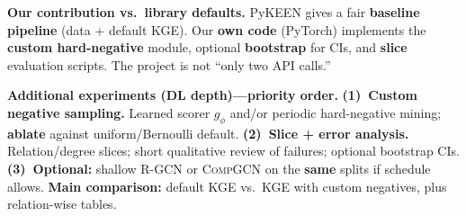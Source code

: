 \documentclass[10pt,a4paper]{article}
\begin{document}
\textbf{Our contribution vs.\ library defaults.}
PyKEEN gives a fair \textbf{baseline pipeline} (data + default KGE). Our \textbf{own code} (PyTorch) implements the \textbf{custom hard-negative} module, optional \textbf{bootstrap} for CIs, and \textbf{slice} evaluation scripts. The project is not ``only two API calls.''

\textbf{Additional experiments (DL depth)---priority order.}
\textbf{(1)~Custom negative sampling.} Learned scorer $g_\phi$ and/or periodic hard-negative mining; \textbf{ablate} against uniform/Bernoulli default. \textbf{(2)~Slice + error analysis.} Relation/degree slices; short qualitative review of failures; optional bootstrap CIs. \textbf{(3)~Optional:} shallow \textsc{R-GCN} or \textsc{CompGCN} on the \textbf{same} splits if schedule allows. \textbf{Main comparison:} default KGE vs.\ KGE with custom negatives, plus relation-wise tables.

\vspace{0.15em}
\begin{footnotesize}


\end{footnotesize}
\end{document}
